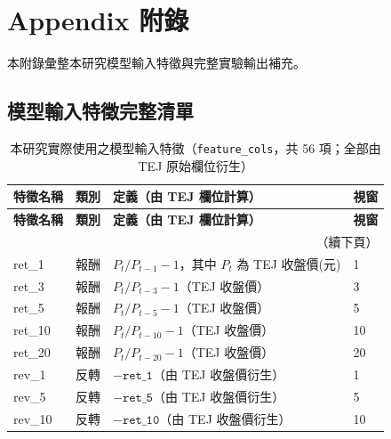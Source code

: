 \titleformat{\chapter}{\normalfont\huge\bfseries}{}{1em}{}

\chapter{Appendix 附錄}
\label{ch:appendix}

本附錄彙整本研究模型輸入特徵與完整實驗輸出補充。

\section{模型輸入特徵完整清單}

\renewcommand{\arraystretch}{1.15}
\begin{longtable}{p{3.1cm} p{2.6cm} p{7.4cm} p{1.6cm}}
\caption{本研究實際使用之模型輸入特徵（\texttt{feature\_cols}，共 56 項；全部由 TEJ 原始欄位衍生）}
\label{tab:feature_cols_54_full}\\
\toprule
\textbf{特徵名稱} & \textbf{類別} & \textbf{定義（由 TEJ 欄位計算）} & \textbf{視窗} \\
\midrule
\endfirsthead

\toprule
\textbf{特徵名稱} & \textbf{類別} & \textbf{定義（由 TEJ 欄位計算）} & \textbf{視窗} \\
\midrule
\endhead

\midrule
\multicolumn{4}{r}{（續下頁）}\\
\endfoot

\bottomrule
\endlastfoot

ret\_1  & 報酬 & $P_t/P_{t-1}-1$，其中 $P_t$ 為 TEJ 收盤價(元) & 1 \\
ret\_3  & 報酬 & $P_t/P_{t-3}-1$（TEJ 收盤價） & 3 \\
ret\_5  & 報酬 & $P_t/P_{t-5}-1$（TEJ 收盤價） & 5 \\
ret\_10 & 報酬 & $P_t/P_{t-10}-1$（TEJ 收盤價） & 10 \\
ret\_20 & 報酬 & $P_t/P_{t-20}-1$（TEJ 收盤價） & 20 \\

rev\_1  & 反轉 & $-\texttt{ret\_1}$（由 TEJ 收盤價衍生） & 1 \\
rev\_5  & 反轉 & $-\texttt{ret\_5}$（由 TEJ 收盤價衍生） & 5 \\
rev\_10 & 反轉 & $-\texttt{ret\_10}$（由 TEJ 收盤價衍生） & 10 \\


\end{longtable}
